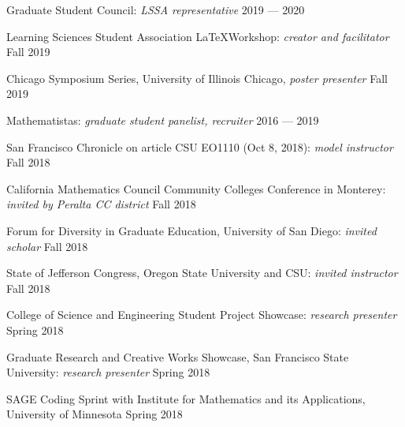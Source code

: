 Graduate Student Council: \textit{LSSA representative}	\hfill 2019 --- 2020
 
Learning Sciences Student Association \LaTeX Workshop: \textit{creator and facilitator}	\hfill Fall 2019

Chicago Symposium Series, University of Illinois Chicago, \textit{poster presenter}	\hfill Fall 2019



Mathematistas: \textit{graduate student panelist, recruiter} \hfill  2016 --- 2019

San Francisco Chronicle on article CSU EO1110 (Oct 8, 2018): \textit{model instructor} \hfill Fall 2018

California Mathematics Council Community Colleges Conference in Monterey: \textit{invited by Peralta CC district}	\hfill Fall 2018

Forum for Diversity in Graduate Education, University of San Diego: \textit{invited scholar} \hfill	Fall 2018

State of Jefferson Congress, Oregon State University and CSU: \textit{invited instructor}	\hfill Fall 2018

College of Science and Engineering Student Project Showcase: \textit{research presenter}	\hfill Spring 2018

Graduate Research and Creative Works Showcase, San Francisco State University: \textit{research presenter}	\hfill Spring 2018

SAGE Coding Sprint with Institute for Mathematics and its Applications, University of Minnesota	\hfill Spring 2018


